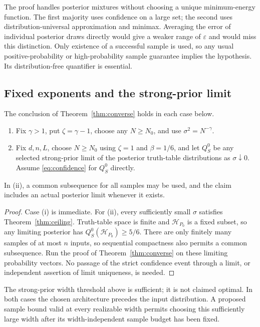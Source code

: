 The proof handles posterior mixtures without choosing a unique
minimum-energy function. The first majority uses confidence on a large
set; the second uses distribution-universal approximation and minimax.
Averaging the error of individual posterior draws directly would give
a weaker range of $\varepsilon$ and would miss this distinction.
Only existence of a successful sample is used, so any usual
positive-probability or high-probability sample guarantee implies the
hypothesis. Its distribution-free quantifier is essential.

\subsection{Fixed exponents and the strong-prior limit}

\begin{corollary}
\label{cor:regimes}
The conclusion of Theorem~\ref{thm:converse} holds in each case below.
\begin{enumerate}[label=(\roman*)]
\item Fix $\gamma>1$, put $\zeta=\gamma-1$, choose any
$N\ge N_0$, and use $\sigma^2=N^{-\gamma}$.
\item Fix $d,n,L$, choose $N\ge N_0$ using $\zeta=1$ and
$\beta=1/6$, and let $Q_S^0$ be any selected strong-prior limit of
the posterior truth-table distributions as $\sigma\downarrow0$.
Assume \eqref{eq:confidence} for $Q_S^0$ directly.
\end{enumerate}
In (ii), a common subsequence for all samples may be used, and the
claim includes an actual posterior limit whenever it exists.
\end{corollary}
\begin{proof}
Case (i) is immediate. For (ii), every sufficiently small $\sigma$
satisfies Theorem~\ref{thm:ceiling}. Truth-table space is finite and
$\mathcal H_{P_0}$ is a fixed subset, so any limiting posterior has
$Q_S^0(\mathcal H_{P_0})\ge5/6$. There are only finitely many
samples of at most $n$ inputs, so sequential compactness also permits
a common subsequence. Run the proof of Theorem~\ref{thm:converse}
on these limiting probability vectors. No passage of the strict
confidence event through a limit, or independent assertion of limit
uniqueness, is needed.
\end{proof}

The strong-prior width threshold above is sufficient; it is not
claimed optimal. In both cases the chosen architecture precedes
the input distribution. A proposed sample bound valid at every
realizable width permits choosing this sufficiently large width after
its width-independent sample budget has been fixed.

